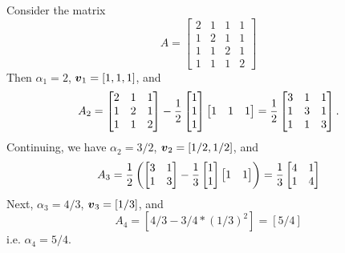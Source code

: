 \begin{example} Consider the matrix
\[
A = \begin{bmatrix}
2 &1 &1 &1 \\
1 & 2 & 1 & 1 \\
1 & 1 & 2 & 1 \\
1 & 1 & 1 & 2
\end{bmatrix}
\]
Then $\ensuremath{\alpha}_1 = 2$, $\bm{{\mbox{\boldmath$v$\unboldmath}}}_1 = [1,1,1]$, and
\[
A_2 = \begin{bmatrix}
2 &1 &1 \\
1 & 2 & 1 \\
1 & 1 & 2
\end{bmatrix} - {1 \over 2} \begin{bmatrix} 1 \\ 1 \\ 1 \end{bmatrix} \begin{bmatrix} 1 & 1 & 1 \end{bmatrix}
={1 \over 2} \begin{bmatrix}
3 & 1 & 1 \\
1 & 3 & 1 \\
1 & 1 & 3
\end{bmatrix}.
\]
Continuing, we have $\ensuremath{\alpha}_2 = 3/2$, $\bm{{\mbox{\boldmath$v$\unboldmath}}}_2 = [1/2,1/2]$, and
\[
A_3 = {1 \over 2} \left( \begin{bmatrix}
3 & 1 \\ 1 & 3
\end{bmatrix} - {1 \over 3} \begin{bmatrix} 1 \\ 1  \end{bmatrix} \begin{bmatrix} 1 & 1  \end{bmatrix}
\right)
= {1 \over 3} \begin{bmatrix} 4 & 1 \\ 1 & 4 \end{bmatrix}
\]
Next, $\ensuremath{\alpha}_3 = 4/3$, $\bm{{\mbox{\boldmath$v$\unboldmath}}}_3 = [1/3]$, and
\[
A_4 = [4/3 - 3/4 * (1/3)^2] = [5/4]
\]
i.e. $\ensuremath{\alpha}_4 = 5/4$.


\end{example}
